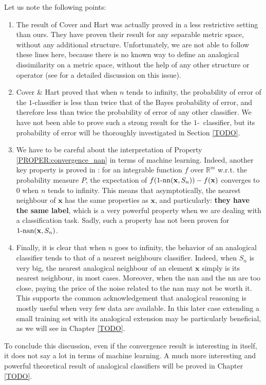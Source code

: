 Let us note the following points:
\begin{enumerate}
\item The result of Cover and Hart was actually proved in a less restrictive
  setting than ours. They have proven their result for any separable metric
    space, without any additional structure. Unfortunately, we are not able to
    follow these lines here, because there is no known way to define an
    analogical dissimilarity on a metric space, without the help of any other
    structure or operator (see \cite{MicBayDelJAIR08} for a detailed discussion
    on this issue).
  \item Cover \& Hart proved that when $n$ tends to infinity, the probability
    of error of the $1$-\NN classifier is less than twice that of the Bayes
    probability of error, and therefore less than twice the probability of error of
    any other classifier. We have not been able to prove such a strong result
    for the $1$-\NAN~classifier, but its probability of error will be thoroughly
    investigated in Section \ref{TODO}.
  \item We have to be careful about the interpretation of Property
    \ref{PROPER:convergence_nan} in terms of machine learning. Indeed, another
    key property is proved in \cite{CovHarTIT67}: for an integrable
    function $f$  over $\mathbb{R}^m$ w.r.t. the probability measure $P$, the
    expectation of $f(1\mbox{-nn}(\mathbf{x},S_n))- f(\mathbf{x})$ converges to 0 when
    $n$ tends to infinity.  This means that asymptotically, the nearest
    neighbour of $\mathbf{x}$ has the same properties as $\mathbf{x}$, and
    particularly: \textbf{they have the same label}, which is a very powerful
    property when we are dealing with a classification task. Sadly, such a
    property has not been proven for $1\text{-nan}(\mathbf{x}, S_n)$.
\item Finally, it is clear that when $n$ goes to infinity, the behavior of an
  analogical classifier tends to that of a nearest neighbours classifier.
    Indeed, when $S_n$ is very big, the nearest analogical neighbour of an
    element $\mathbf{x}$ simply is its nearest neighbour, in most cases.
    Moreover, when the nan and the nn are too close, paying the price of the
    noise related to the nan may not be worth it. This supports the common
    acknowledgement that analogical reasoning is mostly useful when very few
    data are available.  In this later case extending a small training set with
    its analogical extension may be particularly beneficial, as we will see in
    Chapter \ref{TODO}.

\end{enumerate}
To conclude this discussion, even if the convergence result is interesting in
itself, it does not say a lot in terms of machine learning. A much more
interesting and powerful theoretical result of analogical classifiers will be
proved in Chapter \ref{TODO}.


